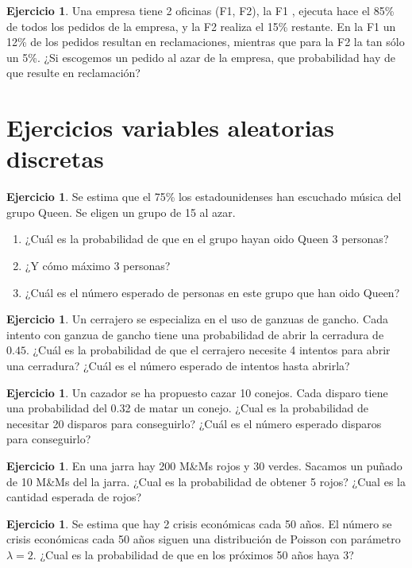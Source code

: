 \documentclass[]{article}
\providecommand{\tightlist}{%
  \setlength{\itemsep}{0pt}\setlength{\parskip}{0pt}}
\theoremstyle{plain}
\theoremstyle{definition}
\newtheorem{exercise}[theorem]{Ejercicio}
\theoremstyle{definition} %
\begin{document}
\begin{exercise}
  Una empresa tiene 2 oficinas (F1, F2), la F1 , ejecuta
  hace el 85\% de todos los pedidos de la empresa, y la F2 realiza el 
  15\% restante. En la F1 un 12\% de los pedidos resultan en reclamaciones, mientras que para la F2 la tan sólo un 5\%.
  ¿Si escogemos un pedido al azar de la empresa, que probabilidad hay de que resulte en reclamación?
\end{exercise}


\section{Ejercicios variables aleatorias discretas}

\begin{exercise}
  Se estima que el 75\% los estadounidenses han escuchado música del grupo Queen. Se eligen un grupo de 15 al azar.

\begin{enumerate}
\def\labelenumii{\arabic{enumii}.}
\tightlist
\item
  ¿Cuál es la probabilidad de que en el grupo hayan oido Queen 3
  personas?
\item
  ¿Y cómo máximo 3 personas?
\item ¿Cuál es el número esperado de personas en este grupo que han oido Queen?
\end{enumerate}
\end{exercise}

\begin{exercise}
  Un cerrajero se especializa en el uso de ganzuas de gancho. Cada intento con ganzua de gancho tiene una probabilidad 
  de abrir la cerradura de $0.45$. 
  ¿Cuál es la probabilidad de que el cerrajero necesite 4 intentos para abrir una cerradura?
  ¿Cuál es el número esperado de intentos hasta abrirla?
\end{exercise}


\begin{exercise}
Un cazador se ha propuesto cazar 10 conejos. Cada disparo tiene una probabilidad del 0.32 de matar un conejo. 
¿Cual es la probabilidad de necesitar 20 disparos para conseguirlo?
¿Cuál es el número esperado disparos para conseguirlo?  
\end{exercise}

\begin{exercise}
En una jarra hay 200 M\&Ms rojos y 30 verdes. Sacamos un puñado de 10 M\&Ms del la jarra. ¿Cual es la probabilidad de obtener 5 rojos?
¿Cual es la cantidad esperada de rojos?
\end{exercise}


\begin{exercise}

  Se estima que hay 2 crisis económicas cada 50 años. El número se crisis económicas 
  cada 50 años siguen una distribución de Poisson con parámetro $\lambda = 2$. 
  ¿Cual es la probabilidad de que en los próximos 50 años haya 3?
 
\end{exercise}
\end{document}
